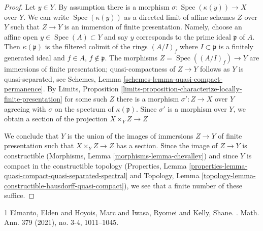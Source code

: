\documentclass[10pt,a4paper]{amsart}
\theoremstyle{plain}
\theoremstyle{definition}
\theoremstyle{remark}
\numberwithin{equation}{subsection}
\def\Spec{\mathop{\mathrm{Spec}}}
\begin{document}
\begin{proof}
Let $y \in Y$. By assumption there is a morphism
$\sigma : \Spec(\kappa(y)) \to X$ over $Y$. We can write $\Spec(\kappa(y))$
as a directed limit of affine schemes $Z$ over $Y$ such that
$Z \to Y$ is an immersion of finite presentation.
Namely, choose an affine open $y \in \Spec(A) \subset Y$
and say $y$ corresponds to the prime ideal $\mathfrak p$ of $A$.
Then $\kappa(\mathfrak p)$ is the filtered colimit of
the rings $(A/I)_f$ where $I \subset \mathfrak p$ is a finitely
generated ideal and $f \in A$, $f \not \in \mathfrak p$.
The morphisms $Z = \Spec((A/I)_f) \to Y$ are immersions of
finite presentation; quasi-compactness of $Z \to Y$
follows as $Y$ is quasi-separated, see
Schemes, Lemma \ref{schemes-lemma-quasi-compact-permanence}.
By Limits, Proposition
\ref{limits-proposition-characterize-locally-finite-presentation}
for some such $Z$ there is a morphism $\sigma' : Z \to X$ over $Y$
agreeing with $\sigma$ on the spectrum of $\kappa(\mathfrak p)$.
Since $\sigma'$ is a morphism over $Y$, we obtain a section
of the projection $X \times_Y Z \to Z$

\medskip\noindent
We conclude that $Y$ is the union of the images of immersions
$Z \to Y$ of finite presentation such that $X \times_Y Z \to Z$
has a section. Since the image of $Z \to Y$ is constructible
(Morphisms, Lemma \ref{morphisms-lemma-chevalley})
and since $Y$ is compact in the constructible topology
(Properties, Lemma
\ref{properties-lemma-quasi-compact-quasi-separated-spectral} and
Topology, Lemma \ref{topology-lemma-constructible-hausdorff-quasi-compact}),
we see that a finite number of these suffice.
\end{proof}

\begin{thebibliography}{1}
Elmanto, Elden and Hoyois, Marc and Iwasa, Ryomei and Kelly, Shane.
.
\newblock Math. Ann. 379 (2021), no. 3-4, 1011--1045.
\end{thebibliography}
\end{document}
